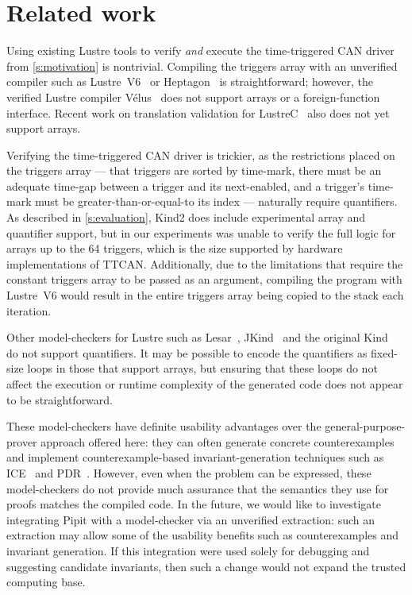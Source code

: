 
\section{Related work}
\label{s:related-work}


Using existing Lustre tools to verify \emph{and} execute the time-triggered CAN driver from \autoref{s:motivation} is nontrivial.
Compiling the triggers array with an unverified compiler such as Lustre~V6~\cite{jahier2016lustre} or Heptagon~\cite{gerard2012modular} is straightforward; however, the verified Lustre compiler Vélus~\cite{bourke2023verified} does not support arrays or a foreign-function interface.
Recent work on translation validation for LustreC~\cite{brun2023equation} also does not yet support arrays.

Verifying the time-triggered CAN driver is trickier, as the restrictions placed on the triggers array --- that triggers are sorted by time-mark, there must be an adequate time-gap between a trigger and its next-enabled, and a trigger's time-mark must be greater-than-or-equal-to its index --- naturally require quantifiers.
As described in \autoref{s:evaluation}, Kind2 does include experimental array and quantifier support, but in our experiments was unable to verify the full logic for arrays up to the 64 triggers, which is the size supported by hardware implementations of TTCAN.
Additionally, due to the limitations that require the constant triggers array to be passed as an argument, compiling the program with Lustre~V6 would result in the entire triggers array being copied to the stack each iteration.

Other model-checkers for Lustre such as Lesar~\cite{raymond2008synchronous}, JKind~\cite{gacek2018jkind} and the original Kind~\cite{hagen2008scaling} do not support quantifiers.
It may be possible to encode the quantifiers as fixed-size loops in those that support arrays, but ensuring that these loops do not affect the execution or runtime complexity of the generated code does not appear to be straightforward.

These model-checkers have definite usability advantages over the general-purpose-prover approach offered here: they can often generate concrete counterexamples and implement counterexample-based invariant-generation techniques such as ICE~\cite{garg2014ice} and PDR~\cite{bradley2011sat,een2011efficient}.
However, even when the problem can be expressed, these model-checkers do not provide much assurance that the semantics they use for proofs matches the compiled code.
In the future, we would like to investigate integrating Pipit with a model-checker via an unverified extraction: such an extraction may allow some of the usability benefits such as counterexamples and invariant generation.
If this integration were used solely for debugging and suggesting candidate invariants, then such a change would not expand the trusted computing base.

